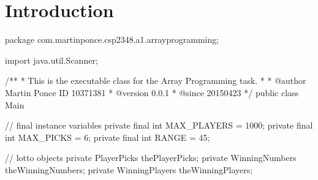 \section{Introduction}

\begin{javacode}
package com.martinponce.csp2348.a1.arrayprogramming;

import java.util.Scanner;

/**
 * This is the executable class for the Array Programming task.
 *
 * @author Martin Ponce ID 10371381
 * @version 0.0.1
 * @since 20150423
 */
public class Main {

    // final instance variables
    private final int MAX_PLAYERS = 1000;
    private final int MAX_PICKS = 6;
    private final int RANGE = 45;

    // lotto objects
    private PlayerPicks thePlayerPicks;
    private WinningNumbers theWinningNumbers;
    private WinningPlayers theWinningPlayers;
}
\end{javacode}